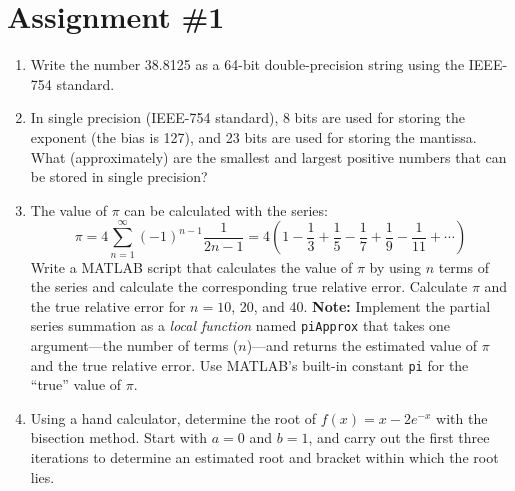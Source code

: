 \chapter{Assignment \#1}
\label{ch:ass1n}
\begin{fullwidth}

\begin{enumerate}
\item Write the number 38.8125 as a 64-bit double-precision string using the IEEE-754 standard. 



\vspace{2.0cm}

\item In single precision (IEEE-754 standard), 8 bits are used for storing the exponent (the bias is 127), and 23 bits are used for storing the mantissa.  What (approximately) are the smallest and largest positive numbers that can be stored in single precision?

\vspace{2.0cm}

\item The value of $\pi$ can be calculated with the series:
\begin{equation*}
\pi = 4 \sum\limits_{n=1}^{\infty} (-1)^{n-1}\frac{1}{2n-1} = 4 \left(1 - \frac{1}{3} + \frac{1}{5} - \frac{1}{7} + \frac{1}{9} - \frac{1}{11} + \cdots \right)
\end{equation*}
Write a MATLAB script that calculates the value of $\pi$ by using $n$ terms of the series and calculate the corresponding true relative error.  Calculate $\pi$ and the true relative error for $n=10$, 20, and 40. \textbf{Note:} Implement the partial series summation as a \emph{local function} named \lstinline[style=myMatlab]{piApprox} that takes one argument---the number of terms ($n$)---and returns the estimated value of $\pi$ and the true relative error.  Use MATLAB's built-in constant \lstinline[style=myMatlab]{pi} for the ``true'' value of $\pi$.

\vspace{2.0cm}

\item Using a hand calculator, determine the root of $f(x)=x-2e^{-x}$ with the bisection method.  Start with $a=0$ and $b=1$, and carry out the first three iterations to determine an estimated root and bracket within which the root lies.

\vspace{2.0cm}


\end{enumerate}
\end{fullwidth}
